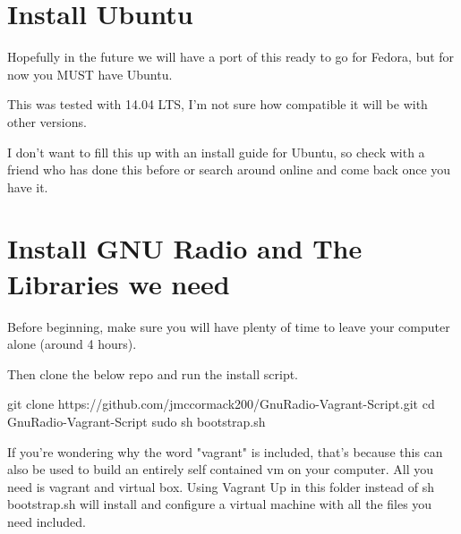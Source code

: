 \section{Install Ubuntu}

Hopefully in the future we will have a port of this ready to go for Fedora, but for now you MUST have Ubuntu.

This was tested with 14.04 LTS, I'm not sure how compatible it will be with other versions. 

I don't want to fill this up with an install guide for Ubuntu, so check with a friend who has done this before
or search around online and come back once you have it.

\section{Install GNU Radio and The Libraries we need}

Before beginning, make sure you will have plenty of time to leave your computer alone (around 4 hours). 

Then clone the below repo and run the install script.

git clone https://github.com/jmccormack200/GnuRadio-Vagrant-Script.git
cd GnuRadio-Vagrant-Script
sudo sh bootstrap.sh


If you're wondering why the word "vagrant" is included, that's because this can also be used to build
an entirely self contained vm on your computer. All you need is vagrant and virtual box. Using Vagrant Up in
this folder instead of sh bootstrap.sh will install and configure a virtual machine with all the files you need included. 


